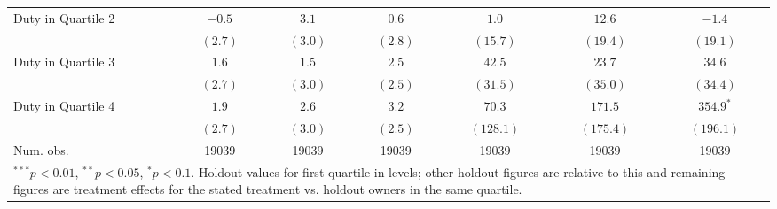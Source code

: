 \documentclass[12pt]{article}
\begin{document}
\begin{center}
\begin{longtable}{l c c c c c c }
Duty in Quartile 2         & $-0.5$        & $3.1$         & $0.6$        & $1.0$         & $12.6$         & $-1.4$         \\
                           & $(2.7)$       & $(3.0)$       & $(2.8)$      & $(15.7)$      & $(19.4)$       & $(19.1)$       \\
Duty in Quartile 3         & $1.6$         & $1.5$         & $2.5$        & $42.5$        & $23.7$         & $34.6$         \\
                           & $(2.7)$       & $(3.0)$       & $(2.5)$      & $(31.5)$      & $(35.0)$       & $(34.4)$       \\
Duty in Quartile 4         & $1.9$         & $2.6$         & $3.2$        & $70.3$        & $171.5$        & $354.9^{*}$    \\
                           & $(2.7)$       & $(3.0)$       & $(2.5)$      & $(128.1)$     & $(175.4)$      & $(196.1)$      \\
\hline
Num. obs.                  & 19039         & 19039         & 19039        & 19039         & 19039          & 19039          \\
\hline
\multicolumn{7}{l}{\scriptsize{\parbox{.75\linewidth}{$^{***}p<0.01$,
      $^{**}p<0.05$, $^*p<0.1$. Holdout values for first quartile in
      levels; other holdout figures are relative to this and remaining
      figures are treatment effects for the stated treatment
      vs. holdout owners in the same quartile.}}}
\end{longtable}
\end{center}
\end{document}
